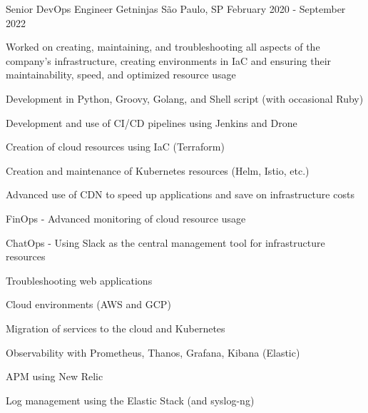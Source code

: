 \begin{cventries}
\cventry
{Senior DevOps Engineer} %
{Getninjas} %
{São Paulo, SP} %
{February 2020 - September 2022} %
{
  \begin{cvitems} %
   \item {Worked on creating, maintaining, and troubleshooting all aspects of the company's infrastructure, creating environments in IaC and ensuring their maintainability, speed, and optimized resource usage}
   \item {Development in Python, Groovy, Golang, and Shell script (with occasional Ruby)}
   \item {Development and use of CI/CD pipelines using Jenkins and Drone}
   \item {Creation of cloud resources using IaC (Terraform)}
   \item {Creation and maintenance of Kubernetes resources (Helm, Istio, etc.)}
   \item {Advanced use of CDN to speed up applications and save on infrastructure costs}
   \item {FinOps - Advanced monitoring of cloud resource usage}
   \item {ChatOps - Using Slack as the central management tool for infrastructure resources}
   \item {Troubleshooting web applications}
   \item {Cloud environments (AWS and GCP)}
   \item {Migration of services to the cloud and Kubernetes}
   \item {Observability with Prometheus, Thanos, Grafana, Kibana (Elastic)}
   \item {APM using New Relic}
   \item {Log management using the Elastic Stack (and syslog-ng)}
  \end{cvitems}
}



\end{cventries}
